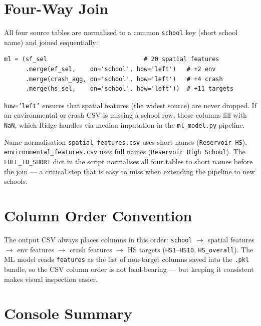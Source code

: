 \documentclass[11pt,a4paper,openany]{book}
\begin{document}
\section{Four-Way Join}

All four source tables are normalised to a common \texttt{school} key (short school name)
and joined sequentially:

\begin{lstlisting}[style=python, caption={Four-way left-join to build the feature matrix.}]
ml = (sf_sel                           # 20 spatial features
      .merge(ef_sel,    on='school', how='left')   # +2 env
      .merge(crash_agg, on='school', how='left')   # +4 crash
      .merge(hs_sel,    on='school', how='left'))  # +11 targets
\end{lstlisting}

\texttt{how='left'} ensures that spatial features (the widest source) are never dropped.
If an environmental or crash CSV is missing a school row, those columns fill with
\texttt{NaN}, which Ridge handles via median imputation in the \texttt{ml\_model.py}
pipeline.

\begin{tipbox}{Name normalisation}
\texttt{spatial\_features.csv} uses short names (\texttt{Reservoir HS}),
\texttt{environmental\_features.csv} uses full names (\texttt{Reservoir High School}).
The \texttt{FULL\_TO\_SHORT} dict in the script normalises all four tables to short names
before the join --- a critical step that is easy to miss when extending the pipeline to
new schools.
\end{tipbox}

\section{Column Order Convention}

The output CSV always places columns in this order:
\texttt{school} $\to$ spatial features $\to$ env features $\to$ crash features $\to$
HS targets (\texttt{HS1}--\texttt{HS10}, \texttt{HS\_overall}).
The ML model reads \texttt{features} as the list of non-target columns saved into the
\texttt{.pkl} bundle, so the CSV column order is not load-bearing --- but keeping it
consistent makes visual inspection easier.

\section{Console Summary}
\end{document}
